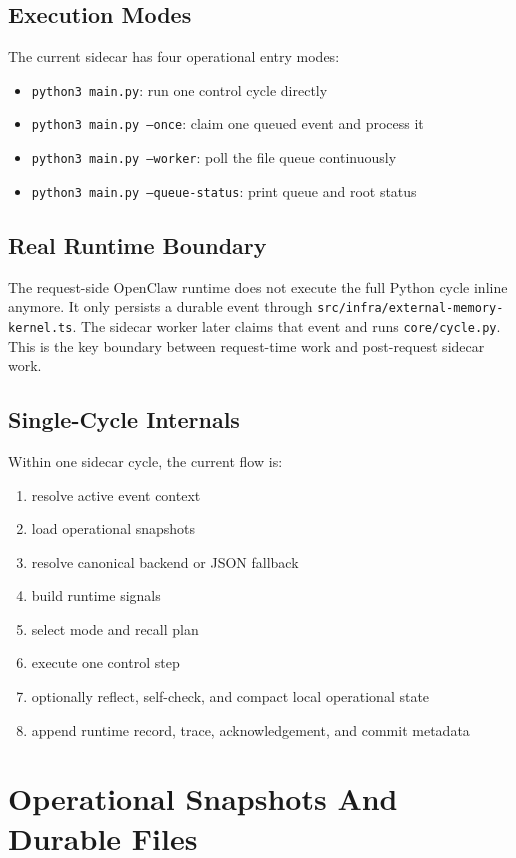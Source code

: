 \documentclass[11pt,a4paper,oneside,openany]{book}
\begin{document}
\section{Execution Modes}
The current sidecar has four operational entry modes:
\begin{itemize}
  \item \texttt{python3 main.py}: run one control cycle directly
  \item \texttt{python3 main.py --once}: claim one queued event and process it
  \item \texttt{python3 main.py --worker}: poll the file queue continuously
  \item \texttt{python3 main.py --queue-status}: print queue and root status
\end{itemize}
\section{Real Runtime Boundary}
The request-side OpenClaw runtime does not execute the full Python cycle inline anymore. It only persists a durable event through \texttt{src/infra/external-memory-kernel.ts}. The sidecar worker later claims that event and runs \texttt{core/cycle.py}. This is the key boundary between request-time work and post-request sidecar work.
\section{Single-Cycle Internals}
Within one sidecar cycle, the current flow is:
\begin{enumerate}
  \item resolve active event context
  \item load operational snapshots
  \item resolve canonical backend or JSON fallback
  \item build runtime signals
  \item select mode and recall plan
  \item execute one control step
  \item optionally reflect, self-check, and compact local operational state
  \item append runtime record, trace, acknowledgement, and commit metadata
\end{enumerate}
\chapter{Operational Snapshots And Durable Files}
\end{document}
